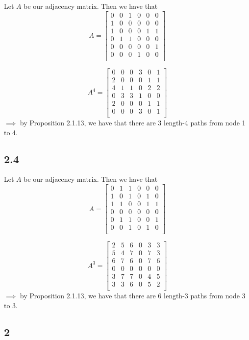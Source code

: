 \documentclass[letterpaper,12pt]{article}
\theoremstyle{definition}
\begin{document}
Let $A$ be our adjacency matrix. Then we have that 
\[A = 
\begin{bmatrix}
    0&0&1&0&0&0\\
    1&0&0&0&0&0\\
    1&0&0&0&1&1\\
    0&1&1&0&0&0\\
    0&0&0&0&0&1\\
    0&0&0&1&0&0\\
\end{bmatrix}
\]

\[A^4 = 
\begin{bmatrix}
    0&0&0&3&0&1\\
    2&0&0&0&1&1\\
    4&1&1&0&2&2\\
    0&3&3&1&0&0\\
    2&0&0&0&1&1\\
    0&0&0&3&0&1\\
\end{bmatrix}
\]
$\implies$ by Proposition 2.1.13, we have that there are 3 length-4 paths from node 1 to 4.

\subsection*{2.4}

Let $A$ be our adjacency matrix. Then we have that 
\[A = 
\begin{bmatrix}
    0&1&1&0&0&0\\
    1&0&1&0&1&0\\
    1&1&0&0&1&1\\
    0&0&0&0&0&0\\
    0&1&1&0&0&1\\
    0&0&1&0&1&0\\
\end{bmatrix}
\]

\[A^3 = 
\begin{bmatrix}
    2&5&6&0&3&3\\
    5&4&7&0&7&3\\
    6&7&6&0&7&6\\
    0&0&0&0&0&0\\
    3&7&7&0&4&5\\
    3&3&6&0&5&2\\
\end{bmatrix}
\]
$\implies$ by Proposition 2.1.13, we have that there are 6 length-3 paths from node 3 to 3.

\subsection*{2}
\end{document}
